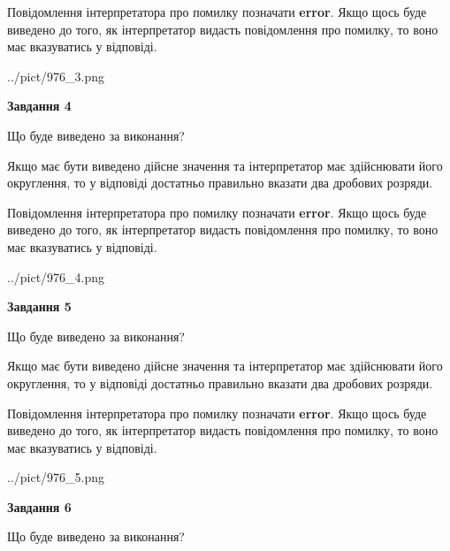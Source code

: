 \documentclass[12pt, ukrainian]{article}
\begin{document}
{\begin {Large}
Повідомлення інтерпретатора про помилку позначати \textbf{error}.
Якщо щось буде виведено до того, як інтерпретатор видасть повідомлення про помилку, 
то воно має вказуватись у відповіді. \par

\begin{center}
	{../pict/976_3.png}
\end{center}
\newpage

{\begin {center}\textbf{Завдання 4}\end {center}}\par
Що буде виведено за виконання? \par

Якщо має бути виведено дійсне значення та інтерпретатор має здійснювати його округлення, 
то у відповіді достатньо правильно вказати два дробових розряди.

Повідомлення інтерпретатора про помилку позначати \textbf{error}.
Якщо щось буде виведено до того, як інтерпретатор видасть повідомлення про помилку, 
то воно має вказуватись у відповіді. \par

\begin{center}
	{../pict/976_4.png}
\end{center}
\newpage

{\begin {center}\textbf{Завдання 5}\end {center}}\par
Що буде виведено за виконання? \par

Якщо має бути виведено дійсне значення та інтерпретатор має здійснювати його округлення, 
то у відповіді достатньо правильно вказати два дробових розряди.

Повідомлення інтерпретатора про помилку позначати \textbf{error}.
Якщо щось буде виведено до того, як інтерпретатор видасть повідомлення про помилку, 
то воно має вказуватись у відповіді. \par

\begin{center}
	{../pict/976_5.png}
\end{center}
\newpage

{\begin {center}\textbf{Завдання 6}\end {center}}\par
Що буде виведено за виконання? \par


\end{Large}}
\end{document}
